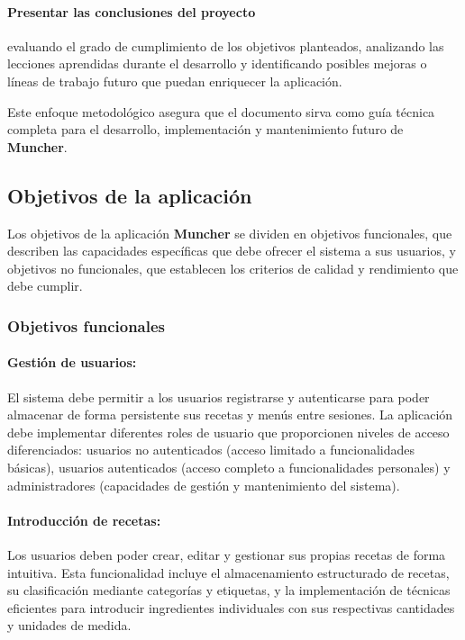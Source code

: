 \paragraph*{Presentar las conclusiones del proyecto}
evaluando el grado de cumplimiento de los objetivos planteados, analizando las lecciones aprendidas durante el desarrollo y identificando posibles mejoras o líneas de trabajo futuro que puedan enriquecer la aplicación.

Este enfoque metodológico asegura que el documento sirva como guía técnica completa para el desarrollo, implementación y mantenimiento futuro de \textbf{Muncher}.

\subsection*{Objetivos de la aplicación}

Los objetivos de la aplicación \textbf{Muncher} se dividen en objetivos funcionales, que describen las capacidades específicas que debe ofrecer el sistema a sus usuarios, y objetivos no funcionales, que establecen los criterios de calidad y rendimiento que debe cumplir.

\subsubsection*{Objetivos funcionales}

\paragraph*{Gestión de usuarios:}
El sistema debe permitir a los usuarios registrarse y autenticarse para poder almacenar de forma persistente sus recetas y menús entre sesiones. La aplicación debe implementar diferentes roles de usuario que proporcionen niveles de acceso diferenciados: usuarios no autenticados (acceso limitado a funcionalidades básicas), usuarios autenticados (acceso completo a funcionalidades personales) y administradores (capacidades de gestión y mantenimiento del sistema).

\paragraph*{Introducción de recetas:}
Los usuarios deben poder crear, editar y gestionar sus propias recetas de forma intuitiva. Esta funcionalidad incluye el almacenamiento estructurado de recetas, su clasificación mediante categorías y etiquetas, y la implementación de técnicas eficientes para introducir ingredientes individuales con sus respectivas cantidades y unidades de medida.

